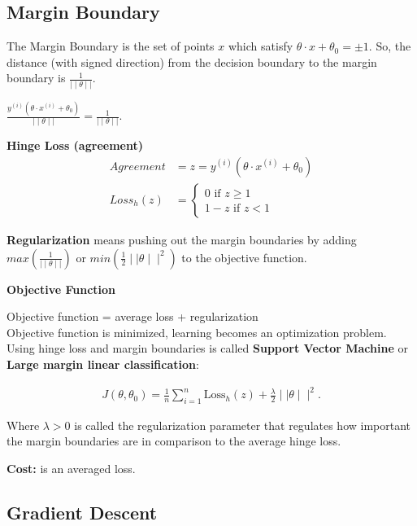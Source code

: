 \subsection{Margin Boundary}

The Margin Boundary is the set of points  $x$  which satisfy $\theta \cdot x + \theta _0= \pm 1$. So, the distance (with signed direction) from the decision boundary to the margin boundary is $\displaystyle \frac{1}{\mid \mid \theta \mid \mid }$.

$\frac{y^{(i)}(\theta \cdot x^{(i)} + \theta _0)}{\mid \mid \theta \mid \mid }=\frac{1}{\mid \mid \theta \mid \mid }.$

\textbf{Hinge Loss (agreement)}
\begin{align*}
Agreement &= z = y^{(i)}(\theta \cdot x^{(i)} + \theta _0)\\
Loss_h(z) &= 
\begin{cases}
		 0 \text{ if } z \geq 1\\
		 1-z \text{ if } z < 1
\end{cases} 
\end{align*}

\textbf{Regularization} means pushing out the margin boundaries by adding $max(\frac{1}{\mid \mid \theta \mid \mid })$ or $min(\frac{1}{2}\mid \mid \theta \mid \mid^2)$ to the objective function.

\textbf{Objective Function}

Objective function = average loss + regularization\\

Objective function is minimized, learning becomes an optimization problem. Using hinge loss and margin boundaries is called \textbf{Support Vector Machine} or \textbf{Large margin linear classification}:

\begin{align*}
J(\theta , \theta _0) = \frac{1}{n} \sum _{i=1}^{n} \text {Loss}_ h (z) + \frac{\lambda }{2} \mid \mid \theta \mid \mid ^2.
\end{align*}

Where $\lambda > 0$ is called the regularization parameter that regulates how important the margin boundaries are in comparison to the average hinge loss.

\textbf{Cost:} is an averaged loss.

\subsection{Gradient Descent}

